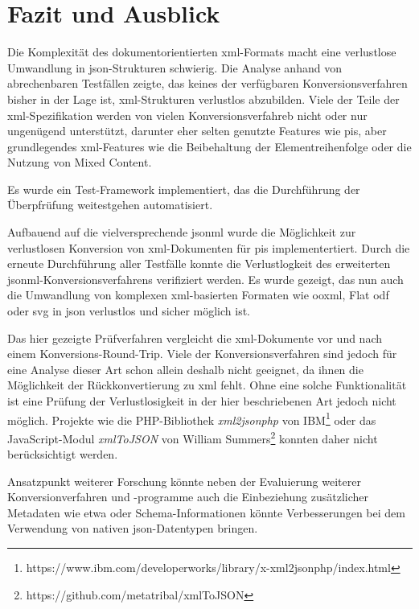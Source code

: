 \chapter{Fazit und Ausblick} \label{chap:conclusion}

Die Komplexität des dokumentorientierten \acrshort{xml}-Formats macht eine verlustlose Umwandlung in \acrshort{json}-Strukturen schwierig. Die Analyse anhand von abrechenbaren Testfällen zeigte, das keines der verfügbaren Konversionsverfahren bisher in der Lage ist, \acrshort{xml}-Strukturen verlustlos abzubilden. Viele der Teile der \acrshort{xml}-Spezifikation werden von vielen Konversionsverfahreb nicht oder nur ungenügend unterstützt, darunter eher selten genutzte Features wie \glspl{pi}, aber grundlegendes \acrshort{xml}-Features wie die Beibehaltung der Elementreihenfolge oder die Nutzung von Mixed Content.

Es wurde ein Test-Framework implementiert, das die Durchführung der Überpfrüfung weitestgehen automatisiert.

Aufbauend auf die vielversprechende \acrfull{jsonml} wurde die Möglichkeit zur verlustlosen Konversion von \acrshort{xml}-Dokumenten für \glspl{pi} implementertiert. Durch die erneute Durchführung aller Testfälle konnte die Verlustlogkeit des erweiterten \acrshort{jsonml}-Konversionsverfahrens verifiziert werden. Es wurde gezeigt, das nun auch die Umwandlung von komplexen \acrshort{xml}-basierten Formaten wie \gls{ooxml}, Flat \gls{odf} oder \gls{svg} in \acrshort{json} verlustlos und sicher möglich ist.

Das hier gezeigte Prüfverfahren vergleicht die \acrshort{xml}-Dokumente vor und nach einem Konversions-Round-Trip. Viele der Konversionsverfahren sind jedoch für eine Analyse dieser Art schon allein deshalb nicht geeignet, da ihnen die Möglichkeit der Rückkonvertierung zu \acrshort{xml} fehlt. Ohne eine solche Funktionalität ist eine Prüfung der Verlustlosigkeit in der hier beschriebenen Art jedoch nicht möglich. Projekte wie die PHP-Bibliothek \emph{xml2jsonphp} von IBM\footnote{https://www.ibm.com/developerworks/library/x-xml2jsonphp/index.html} oder das JavaScript-Modul \emph{xmlToJSON} von William Summers\footnote{https://github.com/metatribal/xmlToJSON} konnten daher nicht berücksichtigt werden.

Ansatzpunkt weiterer Forschung könnte neben der Evaluierung weiterer Konversionverfahren und -programme auch die Einbeziehung zusätzlicher Metadaten wie etwa  oder Schema-Informationen könnte Verbesserungen bei dem Verwendung von nativen \acrshort{json}-Datentypen bringen.


